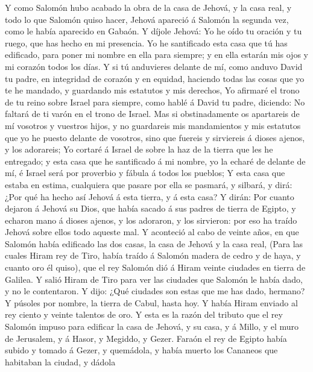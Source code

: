  Y como Salomón hubo acabado la obra de la casa de Jehová, y
la casa real, y todo lo que Salomón quiso hacer,  Jehová
apareció á Salomón la segunda vez, como le había aparecido en Gabaón.
 Y díjole Jehová: Yo he oído tu oración y tu ruego, que has
hecho en mi presencia. Yo he santificado esta casa que tú has edificado,
para poner mi nombre en ella para siempre; y en ella estarán mis ojos y
mi corazón todos los días.  Y si tú anduvieres delante de
mí, como anduvo David tu padre, en integridad de corazón y en equidad,
haciendo todas las cosas que yo te he mandado, y guardando mis estatutos
y mis derechos,  Yo afirmaré el trono de tu reino sobre
Israel para siempre, como hablé á David tu padre, diciendo: No faltará
de ti varón en el trono de Israel.  Mas si obstinadamente os
apartareis de mí vosotros y vuestros hijos, y no guardareis mis
mandamientos y mis estatutos que yo he puesto delante de vosotros, sino
que fuereis y sirviereis á dioses ajenos, y los adorareis; 
Yo cortaré á Israel de sobre la haz de la tierra que les he entregado; y
esta casa que he santificado á mi nombre, yo la echaré de delante de mí,
é Israel será por proverbio y fábula á todos los pueblos;  Y
esta casa que estaba en estima, cualquiera que pasare por ella se
pasmará, y silbará, y dirá: ¿Por qué ha hecho así Jehová á esta tierra,
y á esta casa?  Y dirán: Por cuanto dejaron á Jehová su
Dios, que había sacado á sus padres de tierra de Egipto, y echaron mano
á dioses ajenos, y los adoraron, y los sirvieron: por eso ha traído
Jehová sobre ellos todo aqueste mal.  Y aconteció al cabo
de veinte años, en que Salomón había edificado las dos casas, la casa de
Jehová y la casa real,  (Para las cuales Hiram rey de Tiro,
había traído á Salomón madera de cedro y de haya, y cuanto oro él
quiso), que el rey Salomón dió á Hiram veinte ciudades en tierra de
Galilea.  Y salió Hiram de Tiro para ver las ciudades que
Salomón le había dado, y no le contentaron.  Y dijo: ¿Qué
ciudades son estas que me has dado, hermano? Y púsoles por nombre, la
tierra de Cabul, hasta hoy.  Y había Hiram enviado al rey
ciento y veinte talentos de oro.  Y esta es la razón del
tributo que el rey Salomón impuso para edificar la casa de Jehová, y su
casa, y á Millo, y el muro de Jerusalem, y á Hasor, y Megiddo, y Gezer.
 Faraón el rey de Egipto había subido y tomado á Gezer, y
quemádola, y había muerto los Cananeos que habitaban la ciudad, y dádola
